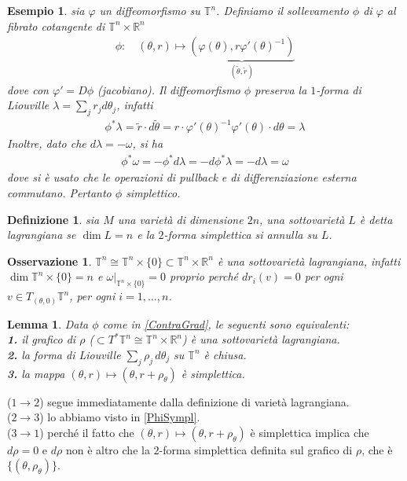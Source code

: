\documentclass[twoside, 11pt]{amsbook}
\makeatletter
\newcommand{\0}{{(0)}}
\newcommand{\3}{{(3)}}
\theoremstyle{colonplain}
\newtheorem{lemma}[thm]{Lemma}
\theoremstyle{colondefinition}
\newtheorem{defn}[thm]{Definizione}
\newtheorem{ex}[thm]{Esempio}
\theoremstyle{colonremark}
\newtheorem{rmk}[thm]{Osservazione}
\numberwithin{equation}{chapter}
\renewcommand{\proofname}{Dimostrazione}
\renewenvironment{proof}[1][\proofname]{\par
  \pushQED{\qed}%
  \normalfont \topsep6\p@\@plus6\p@\relax
  \trivlist
  \item[\hskip\labelsep\bfseries #1:]\ignorespaces
}{%
  \popQED\endtrivlist\@endpefalse
}
\makeatother
\begin{document}
\begin{ex} sia $\varphi$ un diffeomorfismo su $\mathbb{T}^n$. Definiamo il sollevamento $\phi$ di $\varphi$ al fibrato cotangente di $\mathbb{T}^n \times \mathbb{R}^n$
\begin{align}\label{ContraGrad}
    \phi: \quad (\theta, r) \mapsto \underbrace{(\varphi(\theta), r\varphi'(\theta)^{-1})}_{(\tilde{\theta}, \tilde{r})}
\end{align}
dove con $\varphi' = D\phi$ (jacobiano). Il diffeomorfismo $\phi$ preserva la $1$-\textit{forma di Liouville} $\lambda = \sum_j r_jd\theta_j$, infatti
\begin{align}
    \phi^*\lambda = \tilde{r} \cdot d\tilde{\theta} = r \cdot \varphi'(\theta)^{-1}\varphi'(\theta) \cdot d\theta = \lambda
\end{align}
Inoltre, dato che $d\lambda = -\omega$, si ha
\begin{align}\label{PhiSympl}
    \phi^*\omega = -\phi^*d\lambda = -d\phi^*\lambda = -d\lambda = \omega
\end{align}
dove si è usato che le operazioni di pullback e di differenziazione esterna commutano. Pertanto $\phi$ simplettico.
\end{ex}
\begin{defn} sia $M$ una varietà di dimensione $2n$, una sottovarietà $L$ è detta \textit{lagrangiana} se $\dim L = n$ e la  $2$-forma simplettica si annulla su $L$.
\end{defn}
\begin{rmk} $\mathbb{T}^n \cong \mathbb{T}^n \times \{0\} \subset \mathbb{T}^n \times \mathbb{R}^n$ è una sottovarietà lagrangiana, infatti $\dim \mathbb{T}^n \times \{0\} = n$ e $\omega|_{\mathbb{T}^n \times \{0\}} = 0$ proprio perché $dr_i(v) = 0$ per ogni $v \in T_{(\theta, 0)}\mathbb{T}^n$, per ogni $i = 1, \dots, n$.
\end{rmk}
\begin{lemma}
Data $\phi$ come in \eqref{ContraGrad}, le seguenti sono equivalenti: \\
\textbf{1.} il grafico di $\rho$ ($\subset T^*\mathbb{T}^n \cong \mathbb{T}^n \times \mathbb{R}^n$) è una sottovarietà lagrangiana. \\
\textbf{2.} la forma di Liouville $\sum_j \rho_j \, d\theta_j$ su $\mathbb{T}^n$ è chiusa. \\
\textbf{3.} la mappa $(\theta, r) \mapsto (\theta, r + \rho_\theta)$ è simplettica.
\end{lemma}
\begin{proof}
($1 \rightarrow 2$) segue immediatamente dalla definizione di varietà lagrangiana. \\
($2 \rightarrow 3$) lo abbiamo visto in \eqref{PhiSympl}. \\
($3 \rightarrow 1$) perché il fatto che $(\theta, r) \mapsto (\theta, r + \rho_\theta)$ è simplettica implica che $d\rho = 0$ e $d\rho$ non è altro che la $2$-forma simplettica definita sul grafico di $\rho$, che è $\{(\theta, \rho_\theta)\}$.
\end{proof}
\end{document}
